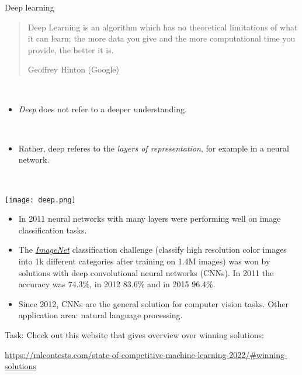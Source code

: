 \documentclass[
  10pt,
  ignorenonframetext,
]{beamer}
\providecommand{\tightlist}{%
  \setlength{\itemsep}{0pt}\setlength{\parskip}{0pt}}
\begin{document}
\begin{frame}
\begin{block}{Deep learning}
\protect\hypertarget{deep-learning}{}
\(~\)

\begin{quote}
Deep Learning is an algorithm which has no theoretical limitations of what it can learn; the more data you give and the more computational time you provide, the better it is. 

Geoffrey Hinton (Google)
\end{quote}

\(~\)

\begin{itemize}
\tightlist
\item
  \emph{Deep} does not refer to a deeper understanding.
\end{itemize}

\(~\)

\begin{itemize}
\tightlist
\item
  Rather, deep referes to the \emph{layers of representation}, for
  example in a neural network.
\end{itemize}

\(~\)

\center

\texttt{[image: deep.png]}
\end{block}
\end{frame}

\begin{frame}
\begin{itemize}
\tightlist
\item
  In 2011 neural networks with many layers were performing well on image
  classification tasks.
\end{itemize}

\vspace{2mm}

\begin{itemize}
\tightlist
\item
  The \href{http://www.image-net.org/}{\emph{ImageNet}} classification
  challenge (classify high resolution color images into 1k different
  categories after training on 1.4M images) was won by solutions with
  deep convolutional neural networks (CNNs). In 2011 the accuracy was
  74.3\%, in 2012 83.6\% and in 2015 96.4\%.
\end{itemize}

\vspace{2mm}

\begin{itemize}
\tightlist
\item
  Since 2012, CNNs are the general solution for computer vision tasks.
  Other application area: natural language processing.
\end{itemize}

\vspace{2mm}

Task: Check out this website that gives overview over winning solutions:

\url{https://mlcontests.com/state-of-competitive-machine-learning-2022/\#winning-solutions}
\end{frame}
\end{document}
